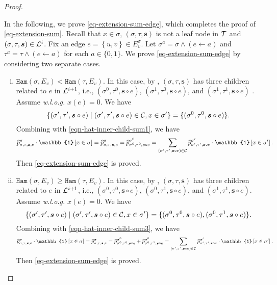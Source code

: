 \documentclass[11pt]{article}
\newcommand{\set}[1]{\left\{#1\right\}}
\renewcommand{\mid}{\;\middle\vert\;} \newcommand{\cmid}{\,:\,}
\newcommand{\id}[1]{\mathbb{1}\left[#1\right]}
\def\!#1{\mathtt{#1}}
\newcommand{\seqS}{\boldsymbol{s}}
\begin{document}
\begin{proof}
\begin{itemize}
    In the following, we prove \eqref{eq-extension-sum-edge}, which completes the proof of \eqref{eq-extension-sum}.
    Recall that $x\in \sigma$, $(\sigma,\tau,\seqS)$ is not a leaf node in $\mathcal{T}$ and $(\sigma,\tau,\seqS) \in \+L^{i}$.
    Fix an edge $ e = \set{u,v} \in E_v^{\sigma}$.
    Let $\sigma^{a} = \sigma \land (e \gets a)$ and $\tau^{a} = \tau \land (e \gets a)$ for each $a\in \{0,1\}$.    
    We prove \eqref{eq-extension-sum-edge} by considering two separate cases. 
        \begin{enumerate}[(i)]
            \item ${\!{Ham}\left(\sigma,{E_v}\right)}<{\!{Ham}\left(\tau,{E_v}\right)}$. In this case, by , $(\sigma,\tau,\seqS)$ has three children related to $e$ in $\mathcal{L}^{i+1}$, i.e., $(\sigma^0, \tau^0, \seqS \circ e)$, $(\sigma^1, \tau^0, \seqS \circ e)$, and $(\sigma^1, \tau^1, \seqS \circ e)$ . Assume \emph{w.l.o.g.} $x(e) = 0$.
            We have 
            \[\left\{(\sigma',\tau', \seqS\circ e)\mid (\sigma',\tau', \seqS\circ e)\in \+C,x\in \sigma'\right\} = \{ (\sigma^0, \tau^0, \seqS \circ e)\}.\]          
            Combining with \eqref{eqn-hat-inner-child-sum1}, we have 
             \begin{align*}
            \widehat{p}^{\sigma}_{\sigma,\tau,\seqS,e}\cdot \id{x \in \sigma} = \widehat{p}^{\sigma}_{\sigma,\tau,\seqS,e}=\widehat{p}^{\sigma^0}_{\sigma^0,\tau^0, \seqS \circ e} = \sum_{(\sigma',\tau', \seqS\circ e)\in \+C} \widehat{p}^{\sigma'}_{\sigma',\tau',\seqS\circ e}\cdot \id{ x\in \sigma'}. 
            \end{align*}
            Then \eqref{eq-extension-sum-edge} is proved. \item ${\!{Ham}\left(\sigma,{E_v}\right)}\geq{\!{Ham}\left(\tau,{E_v}\right)}$. In this case, by ,  $(\sigma,\tau,\seqS)$ has three children related to $e$ in $\mathcal{L}^{i+1}$, i.e., $(\sigma^0, \tau^0, \seqS \circ e)$, $(\sigma^0, \tau^1, \seqS \circ e)$, and $(\sigma^1, \tau^1, \seqS\circ e)$. Assume \emph{w.l.o.g.} $x(e) = 0$.
            We have 
            \[\left\{(\sigma',\tau', \seqS\circ e)\mid (\sigma',\tau', \seqS\circ e)\in \+C,x\in \sigma'\right\} = \{ (\sigma^0, \tau^0, \seqS \circ e),(\sigma^0, \tau^1, \seqS \circ e)\}.\]          
            Combining with \eqref{eqn-hat-inner-child-sum3}, we have 
             \begin{align*}
            \widehat{p}^{\sigma}_{\sigma,\tau,\seqS,e}\cdot \id{x \in \sigma} = \widehat{p}^{\sigma}_{\sigma,\tau,\seqS,e}=\widehat{p}^{\sigma^0}_{\sigma^0,\tau^0, \seqS \circ e} +\widehat{p}^{\sigma^0}_{\sigma^0,\tau^1, \seqS \circ e} = \sum_{(\sigma',\tau', \seqS\circ e)\in \+C} \widehat{p}^{\sigma'}_{\sigma',\tau',\seqS\circ e}\cdot \id{ x\in \sigma'}.  
            \end{align*}
            Then \eqref{eq-extension-sum-edge} is proved.
        \end{enumerate} 
    \end{itemize}
  

\end{proof}
\end{document}
